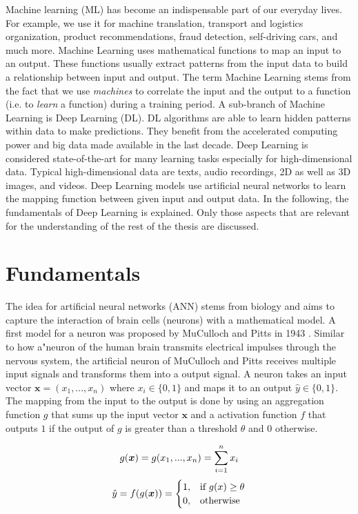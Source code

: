 Machine learning (ML) has become an indispensable part of our everyday lives.
For example, we use it for machine translation, transport and logistics organization, product recommendations, fraud detection, self-driving cars, and much more.
Machine Learning uses mathematical functions to map an input to an output.
These functions usually extract patterns from the input data to build a relationship between input and output.
The term Machine Learning stems from the fact that we use \emph{machines} to correlate the input and the output to a function (i.e. to \emph{learn} a function) during a training period.
A sub-branch of Machine Learning is Deep Learning (DL).
DL algorithms are able to learn hidden patterns within data to make predictions.
They benefit from the accelerated computing power and big data made available in the last decade.
Deep Learning is considered state-of-the-art for many learning tasks especially for high-dimensional data.
Typical high-dimensional data are texts, audio recordings, 2D as well as 3D images, and videos.
Deep Learning models use artificial neural networks to learn the mapping function between given input and output data.
In the following, the fundamentals of Deep Learning is explained.
Only those aspects that are relevant for the understanding of the rest of the thesis are discussed.


\section{Fundamentals}
The idea for artificial neural networks (ANN) stems from biology and aims to capture the interaction of brain cells (neurons) with a mathematical model.
A first model for a neuron was proposed by MuCulloch and Pitts in 1943 .
Similar to how a"neuron of the human brain transmits electrical impulses through the nervous system, the artificial neuron of MuCulloch and Pitts receives multiple input signals and transforms them into a output signal.
A neuron takes an input vector \(\boldsymbol{x} = (x_1, ..., x_n)\) where \(x_i \in \{0, 1\}\) and maps it to an output \(\hat{y} \in \{0, 1\}\).
The mapping from the input to the output is done by using an aggregation function \(g\) that sums up the input vector \(\boldsymbol{x}\) and a activation function \(f\) that outputs \(1\) if the output of \(g\) is greater than a threshold \(\theta\) and \(0\) otherwise.

\begin{equation}\eqlbl{McCulloch_Pitts_agg}
	g(\boldsymbol{x}) = g(x_1, ..., x_n) = \sum_{i=1}^{n}x_i\\
\end{equation}
\begin{equation}\eqlbl{McCulloch_Pitts_act}
		\hat{y} = f(g(\boldsymbol{x})) = \begin{cases}
      		1, & \text{if}\ g(x) \geq \theta \\
      		0, & \text{otherwise}
    	\end{cases}
\end{equation}%

